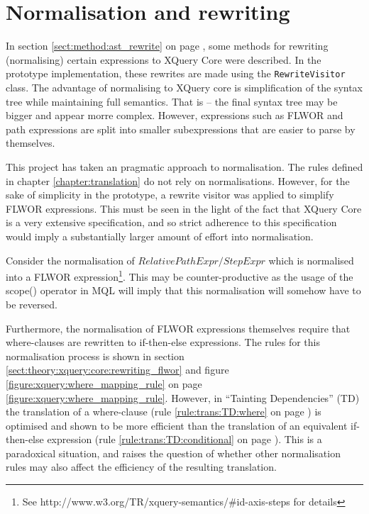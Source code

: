 \section{Normalisation and rewriting}
\label{sect:disc:rewriting}
In section \ref{sect:method:ast_rewrite} on page
\pageref{sect:method:ast_rewrite}, some methods for rewriting (normalising)
certain expressions to XQuery Core were described. In the prototype implementation,
these rewrites are made using the \texttt{RewriteVisitor} class. The advantage
of normalising to XQuery core is simplification of the syntax tree while
maintaining full semantics. That is -- the final syntax tree may be bigger and
appear morre complex. However, expressions such as FLWOR and path expressions
are split into smaller subexpressions that are easier to parse by themselves. 

This project has taken an pragmatic approach to normalisation. The rules
defined in chapter \ref{chapter:translation} do not rely on normalisations.
However, for the sake of simplicity in the prototype, a rewrite visitor was 
applied to simplify FLWOR expressions. This must be seen in the light of the
fact that XQuery Core is a very extensive specification\cite{xquery_semantics},
and so strict adherence to this specification would imply a substantially
larger amount of effort into normalisation.

Consider the normalisation of $RelativePathExpr/StepExpr$ which is normalised
into a FLWOR expression\footnote{See
http://www.w3.org/TR/xquery-semantics/#id-axis-steps for details}. This may be
counter-productive as the usage of the \textsf{scope()} operator in MQL will
imply that this normalisation will somehow have to be reversed.

Furthermore, the normalisation of FLWOR expressions themselves require that
where-clauses are rewritten to if-then-else expressions. The rules for this
normalisation process is shown in section
\ref{sect:theory:xquery:core:rewriting_flwor} and figure
\ref{figure:xquery:where_mapping_rule} on page 
\ref{figure:xquery:where_mapping_rule}. However, in ``Tainting Dependencies''
(TD) the translation of a where-clause (rule \ref{rule:trans:TD:where} on page
\pageref{rule:trans:TD:where}) is optimised and shown to be more efficient than
the translation of an equivalent if-then-else expression (rule
\ref{rule:trans:TD:conditional} on page \pageref{rule:trans:TD:conditional}).
This is a paradoxical situation, and raises the question of whether other
normalisation rules may also affect the efficiency of the resulting
translation.

